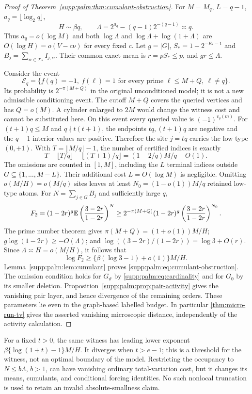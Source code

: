 \begin{proof}[Proof of Theorem~\ref{supp:palm:thm:cumulant-obstruction}]
For $M=M_q$, $L=q-1$, $a_q=\lfloor\log_2q\rfloor$,
\[
 H\sim\beta q,\qquad
 \Lambda=2^{a_q}-(q-1)2^{-(q-1)}\asymp q.
\]
Thus $a_q=o(\log M)$ and both $\log\Lambda$ and
$\log\Lambda+\log(1+\Lambda)$ are $O(\log H)=o(V-c\nu)$ for every fixed $c$.
Let $g=|G|$, $S_*=1-2^{-E_*-1}$ and
$B_j=\sum_{\alpha\in\mathcal T_*}I_{j,\alpha}$.
Their common exact mean is $r=pS_*\le p$, and $gr\le\Lambda$.

Consider the event
\[
 \mathcal E_q=\{f(q)=-1,\ f(\ell)=1
              \text{ for every prime }\ell\le M+Q,\ \ell\ne q\}.
\]
Its probability is $2^{-\pi(M+Q)}$ in the original unconditioned model;
it is not a new admissible conditioning event. The cutoff $M+Q$ covers
the queried vertices and has $Q=o(M)$. A cylinder enlarged to $2M$
would change the witness cost and cannot be substituted here. On this event every queried value is $(-1)^{v_q(m)}$.
For $(t+1)q\le M$ and $q\nmid t(t+1)$, the endpoints $tq,(t+1)q$ are negative and the $q-1$ interior values are positive. Therefore the site $j=tq$ carries the low type $(0,+1)$.
With $T=\lfloor M/q\rfloor-1$, the number of certified indices is exactly
\[
 T-\lfloor T/q\rfloor-\lfloor(T+1)/q\rfloor
       =(1-2/q)M/q+O(1).
\]
The omissions are counted in $[1,M]$, including the $L$ terminal
indices outside $G\subseteq\{1,\ldots,M-L\}$. Their additional cost
$L=O(\log M)$ is negligible. Omitting $o(M/H)=o(M/q)$ sites leaves at least
$N_0=(1-o(1))M/q$ retained low-type atoms.
For $N=\sum_{j\in G}B_j$ and sufficiently large $q$,
\[
 F_2=(1-2r)^g\mathbb E\left(\frac{3-2r}{1-2r}\right)^N
 \ge 2^{-\pi(M+Q)}(1-2r)^g
                   \left(\frac{3-2r}{1-2r}\right)^{N_0}.
\]
The prime number theorem gives $\pi(M+Q)=(1+o(1))M/H$;
$g\log(1-2r)\ge-O(\Lambda)$; and
$\log((3-2r)/(1-2r))=\log3+O(r)$.
Since $\Lambda\asymp H=o(M/H)$, it follows that
\[
 \log F_2\ge\{\beta(\log3-1)+o(1)\}M/H.
\]
Lemma~\ref{supp:palm:lem:cumulant} proves \eqref{supp:palm:eq:cumulant-obstruction}.
The omission condition holds for $G_\vartheta$ by \eqref{supp:palm:eq:cardinality} and for $G_0$ by its smaller deletion. Proposition~\ref{supp:palm:prop:pair-activity} gives the vanishing pair layer, and hence divergence of the remaining orders. These parameters lie even in the graph-based labelled budget. In particular \cref{thm:micro-run-tv} gives the asserted vanishing microscopic distance, independently of the activity calculation.
\end{proof}
For a fixed $t>0$, the same witness has leading lower exponent
$\beta\{\log(1+t)-1\}M/H$. It diverges when $t>e-1$; this is a threshold for the witness, not an optimal boundary of the model. Restricting the occupancy to $N\le b\Lambda$, $b>1$, can have vanishing ordinary total-variation cost, but it changes its means, cumulants, and conditional forcing identities. No such nonlocal truncation is used to retain an invalid absolute-smallness claim.
